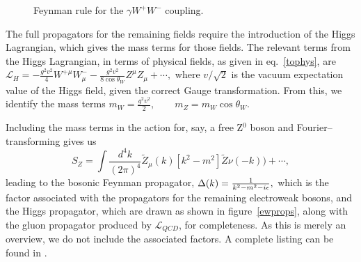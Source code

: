 \begin{figure}[htbp]
\begin{minipage}[b]{.69\textwidth}\centering\footnotesize
{}
\end{minipage}\hfill
\begin{minipage}[b]{.3\textwidth}
\caption{Feynman rule for the $\gamma W^{+}W^{-}$ coupling.}
\label{wwgam}
\end{minipage}
\end{figure}

The full propagators for the remaining fields require the introduction of the Higgs Lagrangian, which gives the mass terms for those fields. The relevant terms from the Higgs Lagrangian, in terms of physical fields, as given in eq.~\eqref{tophys}, are
\(\mathcal{L}_H=-\frac{g^2v^2}{4}W^{+\mu}W^{-}_\mu-\frac{g^2v^2}{8\cos\theta_W}Z^\mu Z_\mu+\cdots,\)
where $v/\sqrt{2}$ is the vacuum expectation value of the Higgs field, given the correct Gauge transformation. From this, we identify the mass terms
\(m_W=\frac{g^2v^2}{2},\qquad m_Z=m_W\cos\theta_W.\)

Including the mass terms in the action for, say, a free Z$^0$ boson and Fourier--transforming gives us
\[S_Z=\int\frac{d^4k}{(2\pi)^4}\tilde Z_\mu(k)[k^2-m^2]\tilde Z\nu(-k)) +\cdots,\]
leading to the bosonic Feynman propagator,
\(\Delta(k)=\frac{1}{k^2-m^2-i\epsilon},\)
which is the factor associated with the propagators for the remaining electroweak bosons, and the Higgs propagator, which are drawn as shown in figure~\ref{ewprops}, along with the gluon propagator produced by $\mathcal{L}_\textit{QCD}$, for completeness. As this is merely an overview, we do not include the associated factors. A complete listing can be found in \cite{allfeynrules}.

